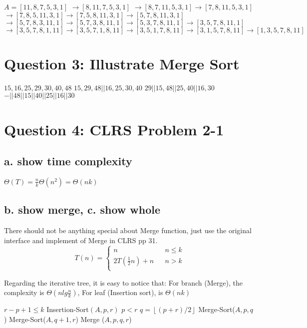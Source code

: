 \documentclass[]{article}
\begin{document}
\begin{codebox}
	\li $A = [11, 8, 7, 5, 3, 1] $
	\li $\rightarrow [8, 11, 7, 5, 3, 1]$
	\li $\rightarrow [8, 7, 11, 5, 3, 1] \rightarrow [7, 8, 11, 5, 3, 1]$
	\li $\rightarrow [7, 8, 5, 11, 3, 1] \rightarrow [7, 5, 8, 11, 3, 1] \rightarrow [5, 7, 8, 11, 3, 1]$
	\li $\rightarrow [5, 7, 8, 3, 11, 1] \rightarrow [5, 7, 3, 8, 11, 1] \rightarrow [5, 3, 7, 8, 11, 1] \rightarrow [3, 5, 7, 8, 11, 1]$
	\li $\rightarrow [3, 5, 7, 8, 1, 11] \rightarrow [3, 5, 7, 1, 8, 11] \rightarrow [3, 5, 1, 7, 8, 11] 
	\rightarrow [3, 1, 5, 7, 8, 11] \rightarrow [1, 3, 5, 7, 8, 11]$
\end{codebox}

\section{Question 3: Illustrate Merge Sort}

\begin{codebox}
	\li $15, 16, 25, 29, 30, 40, 48$
	\li $15, 29, 48 || 16, 25, 30, 40$
	\li $29 || 15, 48 || 25, 40 || 16, 30$
	\li $- || 48 || 15 || 40 || 25 || 16 || 30$
\end{codebox}


\section{Question 4: CLRS Problem 2-1}
\subsection{a. show time complexity}
$\Theta(T) = \frac{n}{k}\Theta(n^{2}) = \Theta(nk)$
\subsection{b. show merge, c. show whole}

There should not be anything special about Merge function, just use the original interface and implement of Merge in CLRS pp 31.\\
$$ T(n)=\left\{
\begin{array}{lcl}
 n       &      & {n \le k}\\
2T(\frac{1}{2}n) + n     &      & {n > k}\\
\end{array} \right. $$

Regarding the iterative tree, it is easy to notice that:
For branch (Merge), the complexity is $\Theta(nlg\frac{n}{k})$, For leaf (Insertion sort), is $\Theta(nk)$
\begin{codebox}
	\li \If $r-p + 1 \le k$
	\li \Then   Insertion-Sort$(A,p,r)$
	\li 		\Return
	\li \ElseIf $p < r$
	\li \Then	$q = \left \lfloor (p+r)/2 \right \rfloor$
	\li 		Merge-Sort($A, p, q$)
	\li			Merge-Sort($A, q+1, r$)
	\li			Merge ($A, p, q, r$)
	\li			\Return
	\li \Else  \Return
		\End
\end{codebox}
\end{document}
